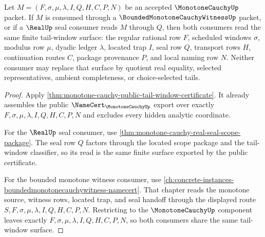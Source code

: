\begin{theorem}
\label{thm:monotone-cauchy-bridge-facing-certificate}
Let $M=(F,\sigma,\mu,\lambda,I,Q,H,C,P,N)$ be an accepted
$\MonotoneCauchyUp$ packet. If $M$ is consumed through a
$\BoundedMonotoneCauchyWitnessUp$ packet, or if a $\RealUp$ seal consumer
reads $M$ through $Q$, then both consumers read the same finite tail-window
surface: the regular rational row $F$, scheduled windows $\sigma$, modulus row
$\mu$, dyadic ledger $\lambda$, located trap $I$, seal row $Q$, transport rows
$H$, continuation routes $C$, package provenance $P$, and local naming row
$N$. Neither consumer may replace that surface by quotient real equality,
selected representatives, ambient completeness, or choice-selected tails.
\end{theorem}
\begin{proof}
Apply \autoref{thm:monotone-cauchy-public-tail-window-certificate}. It already
assembles the public $\NameCert_{\MonotoneCauchyUp}$ export over exactly
$F,\sigma,\mu,\lambda,I,Q,H,C,P,N$ and excludes every hidden analytic
coordinate.

For the $\RealUp$ seal consumer, use
\autoref{thm:monotone-cauchy-real-seal-scope-package}. The seal row $Q$
factors through the located scope package and the tail-window classifier, so
its read is the same finite surface exported by the public certificate.

For the bounded monotone witness consumer, use
\autoref{ch:concrete-instances-boundedmonotonecauchywitness-namecert}. That
chapter reads the monotone source, witness rows, located trap, and seal handoff
through the displayed route $S,F,\sigma,\mu,\lambda,I,Q,H,C,P,N$. Restricting
to the $\MonotoneCauchyUp$ component leaves exactly
$F,\sigma,\mu,\lambda,I,Q,H,C,P,N$, so both consumers share the same
tail-window surface.
\end{proof}

